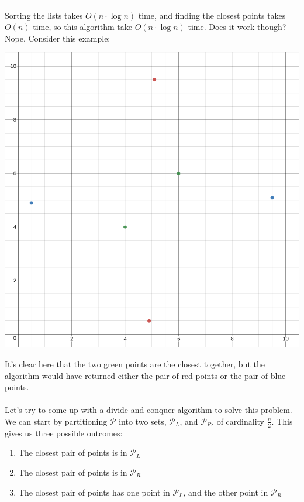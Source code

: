 \documentclass{article}
\newcommand{\x}{\cdot}
\begin{document}
---------------------------------------------------------------------------------------------------------\\
Sorting the lists takes $O(n\x \log n)$ time, and finding the closest points takes $O(n)$ time, so this algorithm take $O(n\x \log n)$ time. Does it work though? Nope. Consider this example:\\
\begin{center}
\includegraphics[scale=0.3]{cpopce}
\end{center}
It's clear here that the two green points are the closest together, but the algorithm would have returned either the pair of red points or the pair of blue points.\\\\
Let's try to come up with a divide and conquer algorithm to solve this problem. We can start by partitioning $\mathcal{P}$ into two sets, $\mathcal{P}_L$, and $\mathcal{P}_R$, of cardinality $\frac{n}{2}$. This gives us three possible outcomes:
\begin{enumerate}
	\item The closest pair of points is in $\mathcal{P}_L$
	\item The closest pair of points is in $\mathcal{P}_R$
	\item The closest pair of points has one point in $\mathcal{P}_L$, and the other point in $\mathcal{P}_R$
\end{enumerate}
\end{document}

